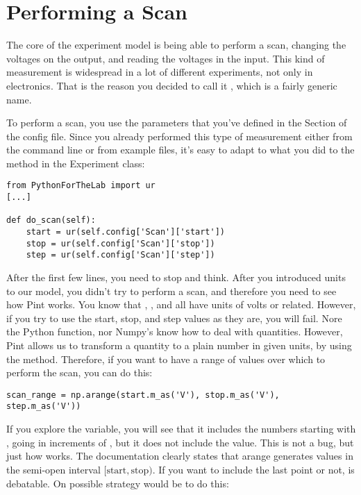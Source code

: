 \section{Performing a Scan}\label{sec:doing-scan}
The core of the experiment model is being able to perform a scan, changing the voltages on the output, and reading the voltages in the input. This kind of measurement is widespread in a lot of different experiments, not only in electronics. That is the reason you decided to call it , which is a fairly generic name.


To perform a scan, you use the parameters that you've defined in the  Section of the config file. Since you already performed this type of measurement either from the command line or from example files, it's easy to adapt to what you did to the method in the Experiment class:

\begin{verbatim}
from PythonForTheLab import ur
[...]

def do_scan(self):
    start = ur(self.config['Scan']['start'])
    stop = ur(self.config['Scan']['stop'])
    step = ur(self.config['Scan']['step'])
\end{verbatim}

After the first few lines, you need to stop and think. After you introduced units to our model, you didn't try to perform a scan, and therefore you need to see how Pint works. You know that , , and  all have units of volts or related. However, if you try to use the start, stop, and step values as they are, you will fail. Nore the Python  function, nor Numpy's  know how to deal with quantities. However, Pint allows us to transform a quantity to a plain number in given units, by using the  method. Therefore, if you want to have a range of values over which to perform the scan, you can do this:

\begin{verbatim}
scan_range = np.arange(start.m_as('V'), stop.m_as('V'), step.m_as('V'))
\end{verbatim}

If you explore the  variable, you will see that it includes the numbers starting with , going in increments of , but it does not include the  value. This is not a bug, but just how  works. The documentation clearly states that arange generates values in the semi-open interval $[\textrm{start}, \textrm{stop})$. If you want to include the last point or not, is debatable. On possible strategy would be to do this:


